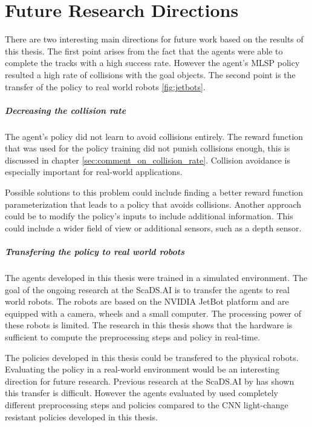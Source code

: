 \chapter{Future Research Directions}
\label{cha:futur_research_directions}

There are two interesting main directions for future work based on the results of this thesis. The first point arises from the fact that the agents were able to complete the tracks with a high success rate. However the agent's \ac{MLSP} policy resulted a high rate of collisions with the goal objects. The second point is the transfer of the policy to real world robots \ref{fig:jetbots}.


\paragraph{Decreasing the collision rate}

The agent's policy did not learn to avoid collisions entirely. The reward function that was used for the policy training did not punish collisions enough, this is discussed in chapter \ref{sec:comment_on_collision_rate}. Collision avoidance is especially important for real-world applications.

Possible solutions to this problem could include finding a better reward function parameterization that leads to a policy that avoids collisions. Another approach could be to modify the policy's inputs to include additional information. This could include a wider field of view or additional sensors, such as a depth sensor.

\paragraph{Transfering the policy to real world robots}

The agents developed in this thesis were trained in a simulated environment. The goal of the ongoing research at the ScaDS.AI is to transfer the agents to real world robots. The robots are based on the NVIDIA JetBot platform and are equipped with a camera, wheels and a small computer. The processing power of these robots is limited. The research in this thesis shows that the hardware is sufficient to compute the preprocessing steps and policy in real-time.

The policies developed in this thesis could be transfered to the physical robots. Evaluating the policy in a real-world environment would be an interesting direction for future research. Previous research at the ScaDS.AI by \textcite{merlin_flach} has shown this transfer is difficult. However the agents evaluated by \textcite{merlin_flach} used completely different preprocessing steps and policies compared to the \ac{CNN} light-change resistant policies developed in this thesis. 



